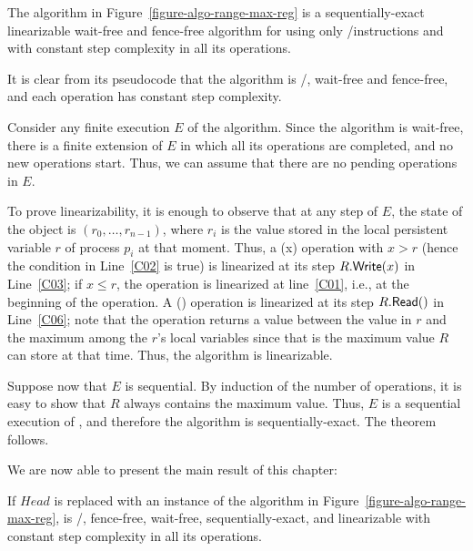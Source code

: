\vspace{1cm}
\begin{theorem}\label{theo-range-max-reg}
  The algorithm in Figure~\ref{figure-algo-range-max-reg} is a sequentially-exact linearizable wait-free and fence-free algorithm for \RangeMaxReg using only \R/\W instructions and with constant step complexity in all its operations.
\end{theorem}

\begin{proofT}
It is clear from its pseudocode that the algorithm is \R/\W, wait-free and fence-free, and each operation has constant step complexity.

Consider any finite execution \(E\) of the algorithm. Since the algorithm is wait-free, there is a finite extension of \(E\) in which all its operations are completed, and no new operations start. Thus, we can assume that there are no pending operations in \(E\).

To prove linearizability, it is enough to observe that at any step of \(E\), the state of the object is \((r_0, \hdots, r_{n-1})\), where \(r_i\) is the value stored in the local persistent variable \(r\) of process \(p_i\) at that moment.  Thus, a \RMaxW(x) operation with \(x > r\) (hence the condition in Line~\ref{C02} is {\sf \small true}) is linearized at its step \(R.{\sf Write}(x)\) in Line~\ref{C03}; if \(x \leq r\), the operation is linearized at line~\ref{C01}, i.e., at the beginning of the operation.  A \RMaxR() operation is linearized at its step \(R.{\sf Read}()\) in Line~\ref{C06}; note that the operation returns a value between the value in \(r\) and the maximum among the \(r\)'s local variables since that is the maximum value \(R\) can store at that time. Thus, the algorithm is linearizable.

Suppose now that \(E\) is sequential. By induction of the number of operations, it is easy to show that \(R\) always contains the maximum value. Thus, \(E\) is a sequential execution of \MaxReg, and therefore the algorithm is sequentially-exact. The theorem follows.
\end{proofT}

We are now able to present the main result of this chapter:
\begin{theorem}\label{theo-wf-fully}
If \(Head\) is replaced with an instance of the algorithm in Figure~\ref{figure-algo-range-max-reg}, \NCWSM is \R/\W, fence-free, wait-free, sequentially-exact, and linearizable with constant step complexity in all its operations.
\end{theorem}

